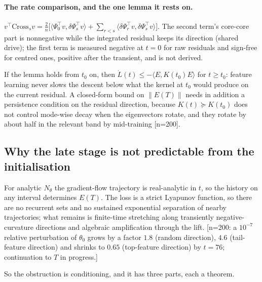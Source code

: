 \paragraph{The rate comparison, and the one lemma it rests on.}
\begin{lemma}
\label{lem:sign}
$v^{\!\top}\mathrm{Cross}_sv=\frac2n\big[\langle\Psi_0^{\!\top}v,\delta\Psi_s^{\!\top}v\rangle+\sum_{r<s}\langle\delta\Psi_r^{\!\top}v,\delta\Psi_s^{\!\top}v\rangle\big]$.
The second term's core-core part is nonnegative while the integrated residual
keeps its direction (shared drive); the first term is measured negative at
$t=0$ for raw residuals and sign-free for centred ones, positive after the
transient, and is not derived.
\end{lemma}
If the lemma holds from $t_0$ on, then $\dot L(t)\le-\langle E,K(t_0)E\rangle$ for
$t\ge t_0$: feature learning never slows the descent below what the kernel at
$t_0$ would produce on the current residual. A closed-form bound on
$\|E(T)\|$ needs in addition a persistence condition on the residual
direction, because $K(t)\succeq K(t_0)$ does not control mode-wise decay when
the eigenvectors rotate, and they rotate by about half in the relevant band by
mid-training [n=200].

\subsection{Why the late stage is not predictable from the initialisation}
\label{ssec:chain-impossible}

\begin{proposition}
\label{prop:nochaos}
For analytic $N_\theta$ the gradient-flow trajectory is real-analytic in $t$, so
the history on any interval determines $E(T)$. The loss is a strict Lyapunov
function, so there are no recurrent sets and no sustained exponential
separation of nearby trajectories; what remains is finite-time stretching
along transiently negative-curvature directions and algebraic amplification
through the lift. [n=200: a $10^{-7}$ relative perturbation of $\theta_0$ grows by
a factor $1.8$ (random direction), $4.6$ (tail-feature direction) and shrinks to
$0.65$ (top-feature direction) by $t=76$; continuation to $T$ in progress.]
\end{proposition}

So the obstruction is conditioning, and it has three parts, each a theorem.

